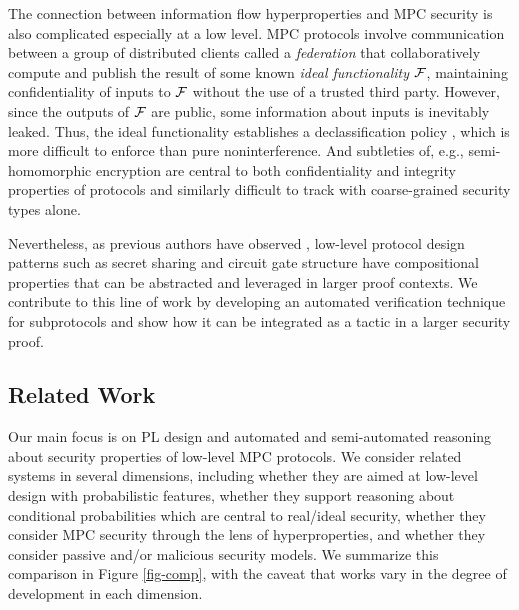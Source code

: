 The connection between information flow hyperproperties and
MPC security is also complicated especially at a low level.
MPC protocols involve communication between a group of distributed
clients called a \emph{federation} that collaboratively compute
and publish the result of some known \emph{ideal functionality}
$\mathcal{F}$, maintaining confidentiality of inputs to $\mathcal{F}$ without
the use of a trusted third party. However, since the outputs of
$\mathcal{F}$ are public, some information about inputs is inevitably
leaked. Thus, the ideal
functionality establishes a declassification policy \cite{XXX}, which
is more difficult to enforce than pure noninterference.  And
subtleties of, e.g., semi-homomorphic encryption are central to both
confidentiality and integrity properties of protocols and similarly
difficult to track with coarse-grained security types alone.

Nevertheless, as previous authors have observed \cite{XXX}, low-level
protocol design patterns such as secret sharing and circuit gate
structure have compositional properties that can be abstracted and
leveraged in larger proof contexts. We contribute to this line of work
by developing an automated verification technique for subprotocols and
show how it can be integrated as a tactic in a larger security proof.

\compfig

\subsection{Related Work}
\label{section-related-work}

Our main focus is on PL design and automated and semi-automated
reasoning about security properties of low-level MPC protocols.  We
consider related systems in several dimensions, including
whether they are aimed at low-level design with probabilistic features,
whether they support reasoning about conditional probabilities which
are central to real/ideal security, whether they consider MPC
security through the lens of hyperproperties, and whether they consider
passive and/or malicious security models. We summarize this comparison
in Figure \ref{fig-comp}, with the caveat that works vary in the degree
of development in each dimension.

